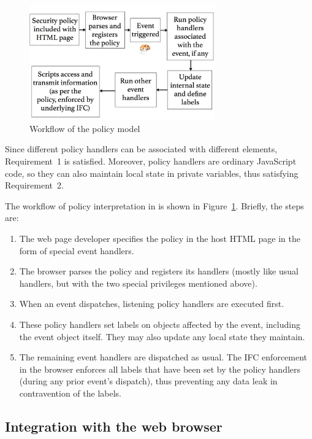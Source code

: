 \begin{figure}[tb]
  \centering \includegraphics[width=8cm]{chapters/browser/webpol/Model.pdf} \caption{Workflow
  of the {\sys} policy model} \label{fig:model}
\end{figure}

Since different policy handlers can be associated with different
elements, Requirement~1 is satisfied.  Moreover, policy handlers are
ordinary JavaScript code, so they can also maintain local state in
private variables, thus satisfying Requirement~2. 

The workflow of policy interpretation in {\sys} is shown in
Figure~\ref{fig:model}. Briefly, the steps are:

\begin{enumerate}
\item The web page developer specifies the policy in the host HTML
  page in the form of special event handlers.
\item The browser parses the policy and registers its handlers (mostly
  like usual handlers, but with the two special privileges mentioned
  above).
\item When an event dispatches, listening policy handlers are
  executed first.
\item These policy handlers set labels on objects affected by the
  event, including the event object itself. They may also
  update any local state they maintain.
\item The remaining event handlers are dispatched as usual.
  The IFC enforcement in the browser enforces all labels that have
  been set by the policy handlers (during any prior event's dispatch),
  thus preventing any data leak in contravention of the labels.
\end{enumerate}

\subsection{Integration with the web browser}

